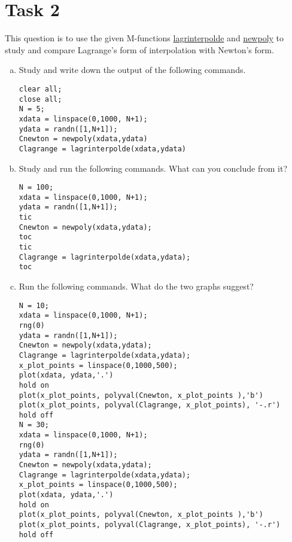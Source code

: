 \section*{Task 2}
This question is to use the given M-functions \hyperref[lagrinterpolde]{lagrinterpolde} and \hyperref[newpoly]{newpoly} to study and compare Lagrange's form of interpolation with Newton's form.
\begin{enumerate}[(a)]
	\item Study and write down the output of the following commands.
	\begin{lstlisting}[style=Matlab-editor]
clear all;
close all;
N = 5;
xdata = linspace(0,1000, N+1);
ydata = randn([1,N+1]);
Cnewton = newpoly(xdata,ydata)
Clagrange = lagrinterpolde(xdata,ydata)
	\end{lstlisting}
	\item Study and run the following commands. What can you conclude from it?
	\begin{lstlisting}[style=Matlab-editor]
N = 100;
xdata = linspace(0,1000, N+1);
ydata = randn([1,N+1]);
tic
Cnewton = newpoly(xdata,ydata);
toc
tic
Clagrange = lagrinterpolde(xdata,ydata);
toc
	\end{lstlisting}
	\item Run the following commands.
	What do the two graphs suggest?
	\begin{lstlisting}[style=Matlab-editor]
N = 10;
xdata = linspace(0,1000, N+1);
rng(0)
ydata = randn([1,N+1]);
Cnewton = newpoly(xdata,ydata);
Clagrange = lagrinterpolde(xdata,ydata);
x_plot_points = linspace(0,1000,500);
plot(xdata, ydata,'.')
hold on
plot(x_plot_points, polyval(Cnewton, x_plot_points ),'b')
plot(x_plot_points, polyval(Clagrange, x_plot_points), '-.r')
hold off
N = 30;
xdata = linspace(0,1000, N+1);
rng(0)
ydata = randn([1,N+1]);
Cnewton = newpoly(xdata,ydata);
Clagrange = lagrinterpolde(xdata,ydata);
x_plot_points = linspace(0,1000,500);
plot(xdata, ydata,'.')
hold on
plot(x_plot_points, polyval(Cnewton, x_plot_points ),'b')
plot(x_plot_points, polyval(Clagrange, x_plot_points), '-.r')
hold off
	\end{lstlisting}
\end{enumerate}


